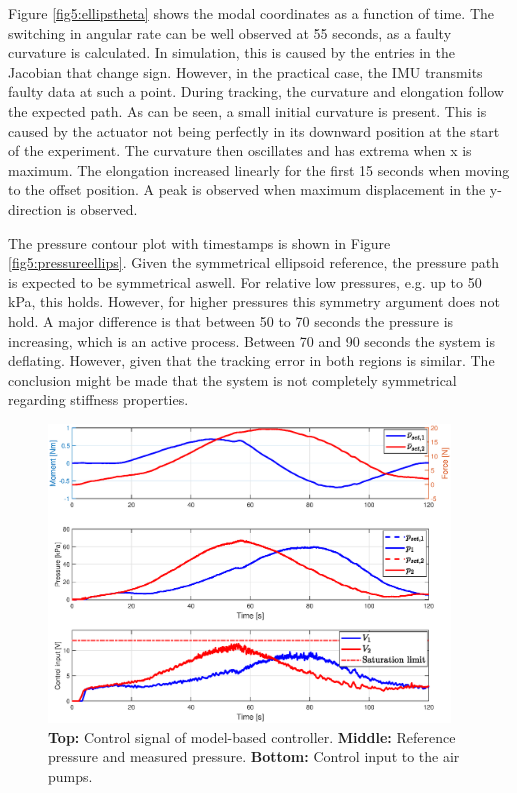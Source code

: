 Figure \ref{fig5:ellipstheta} shows the modal coordinates as a function of time. The switching in angular rate can be well observed at 55 seconds, as a faulty curvature is calculated. In simulation, this is caused by the entries in the Jacobian that change sign. However, in the practical case, the IMU transmits faulty data at such a point. During tracking, the curvature and elongation follow the expected path. As can be seen, a small initial curvature is present. This is caused by the actuator not being perfectly in its downward position at the start of the experiment. The curvature then oscillates and has extrema when x is maximum. The elongation increased linearly for the first 15 seconds when moving to the offset position. A peak is observed when maximum displacement in the y-direction is observed. 

The pressure contour plot with timestamps is shown in Figure \ref{fig5:pressureellips}. Given the symmetrical ellipsoid reference, the pressure path is expected to be symmetrical aswell. For relative low pressures, e.g. up to 50 kPa, this holds. However, for higher pressures this symmetry argument does not hold. A major difference is that between 50 to 70 seconds the pressure is increasing, which is an active process. Between 70 and 90 seconds the system is deflating. However, given that the tracking error in both regions is similar. The conclusion might be made that the system is not completely symmetrical regarding stiffness properties. 




\begin{figure}[H]
    \centering
    \includegraphics[width = 0.95\textwidth]{Figures/Chapter5/inputsellips.eps}
    \caption{\textbf{Top:} Control signal of model-based controller. \textbf{Middle:} Reference pressure and measured pressure. \textbf{Bottom:} Control input to the air pumps.}
    \label{fig5:controlellips}
\end{figure}




